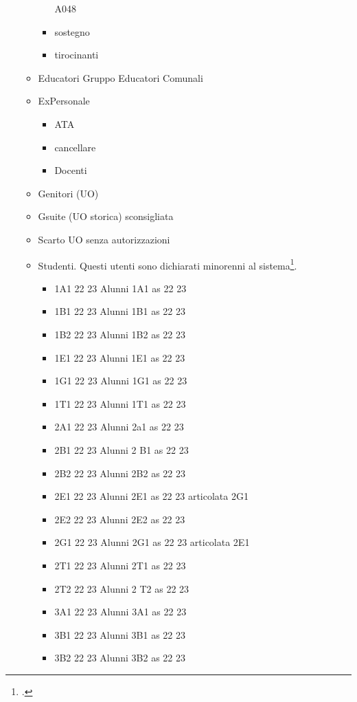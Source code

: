 \begin{itemize}
\begin{itemize}
\begin{itemize}
		A048 
		\item sostegno
		\item tirocinanti
		\end{itemize}
\item  Educatori
Gruppo Educatori Comunali
\item ExPersonale
\begin{itemize}
	\item ATA
	\item cancellare
	\item Docenti
\end{itemize}
\item Genitori (UO)
\item Gsuite (UO storica) sconsigliata
\item Scarto UO senza autorizzazioni
\item Studenti. Questi utenti sono dichiarati minorenni al sistema\footcite{Google2021b}.
\begin{itemize}
	\item 1A1 22 23
	Alunni 1A1 as 22 23
	\item 1B1 22 23
	Alunni 1B1 as 22 23
	\item 1B2 22 23
	Alunni 1B2 as 22 23
	\item 1E1 22 23
	Alunni 1E1 as 22 23	
	\item 1G1 22 23
	Alunni 1G1 as 22 23	
	\item 1T1 22 23
	Alunni 1T1 as 22 23	
	\item 2A1 22 23
	Alunni 2a1 as 22 23	
	\item 2B1 22 23
	Alunni 2 B1 as 22 23	
	\item 2B2 22 23
	Alunni 2B2 as 22 23	
	\item 2E1 22 23
	Alunni 2E1 as 22 23 articolata 2G1	
	\item 2E2 22 23
	Alunni 2E2 as 22 23	
	\item 2G1 22 23
	Alunni 2G1 as 22 23 articolata 2E1	
	\item 2T1 22 23
	Alunni 2T1 as 22 23	
	\item 2T2 22 23
	Alunni 2 T2 as 22 23	
	\item 3A1 22 23
	Alunni 3A1 as 22 23	
	\item 3B1 22 23
	Alunni 3B1 as 22 23	
	\item 3B2 22 23
	Alunni 3B2 as 22 23	

\end{itemize}
\end{itemize}
\end{itemize}
